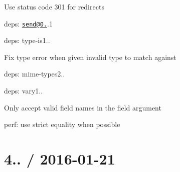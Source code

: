 \begin{DoxyItemize}
\begin{DoxyItemize}
\item Use status code 301 for redirects
\item deps\+: \href{mailto:send@0.14}{\tt send@0.}.1
\end{DoxyItemize}
\item deps\+: type-\/is1..
\begin{DoxyItemize}
\item Fix type error when given invalid type to match against
\item deps\+: mime-\/types2..
\end{DoxyItemize}
\item deps\+: vary1..
\begin{DoxyItemize}
\item Only accept valid field names in the {\ttfamily field} argument
\end{DoxyItemize}
\item perf\+: use strict equality when possible
\end{DoxyItemize}

\section*{4.. / 2016-\/01-\/21 }


